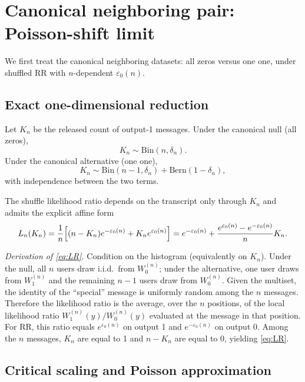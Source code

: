 \documentclass{article}
\begin{document}
\section{Canonical neighboring pair: Poisson-shift limit}

We first treat the canonical neighboring datasets: all zeros versus one one, under shuffled RR with
$n$-dependent $\varepsilon_0(n)$.

\subsection{Exact one-dimensional reduction}

Let $K_n$ be the released count of output-1 messages. Under the canonical null (all zeros),
\begin{equation}
K_n \sim \mathrm{Bin}(n, \delta_n). \label{eq:Kn_null}
\end{equation}
Under the canonical alternative (one one),
\begin{equation}
K_n \sim \mathrm{Bin}(n-1, \delta_n) + \mathrm{Bern}(1 - \delta_n), \label{eq:Kn_alt}
\end{equation}
with independence between the two terms.

The shuffle likelihood ratio depends on the transcript only through $K_n$ and admits the explicit
affine form
\begin{equation}
L_n(K_n) = \frac{1}{n}\Bigl[(n - K_n)e^{-\varepsilon_0(n)} + K_n e^{\varepsilon_0(n)}\Bigr]
= e^{-\varepsilon_0(n)} + \frac{e^{\varepsilon_0(n)} - e^{-\varepsilon_0(n)}}{n} K_n. \label{eq:LR}
\end{equation}

\textit{Derivation of \eqref{eq:LR}.} Condition on the histogram (equivalently on $K_n$). Under the null, all $n$ users
draw i.i.d.\ from $W^{(n)}_0$; under the alternative, one user draws from $W^{(n)}_1$ and the remaining $n-1$
users draw from $W^{(n)}_0$. Given the multiset, the identity of the ``special'' message is uniformly random
among the $n$ messages. Therefore the likelihood ratio is the average, over the $n$ positions, of the
local likelihood ratio $W^{(n)}_1(y)/W^{(n)}_0(y)$ evaluated at the message in that position. For RR, this ratio
equals $e^{\varepsilon_0(n)}$ on output 1 and $e^{-\varepsilon_0(n)}$ on output 0. Among the $n$ messages, $K_n$ are equal to 1 and
$n - K_n$ are equal to 0, yielding \eqref{eq:LR}.

\subsection{Critical scaling and Poisson approximation}
\end{document}

